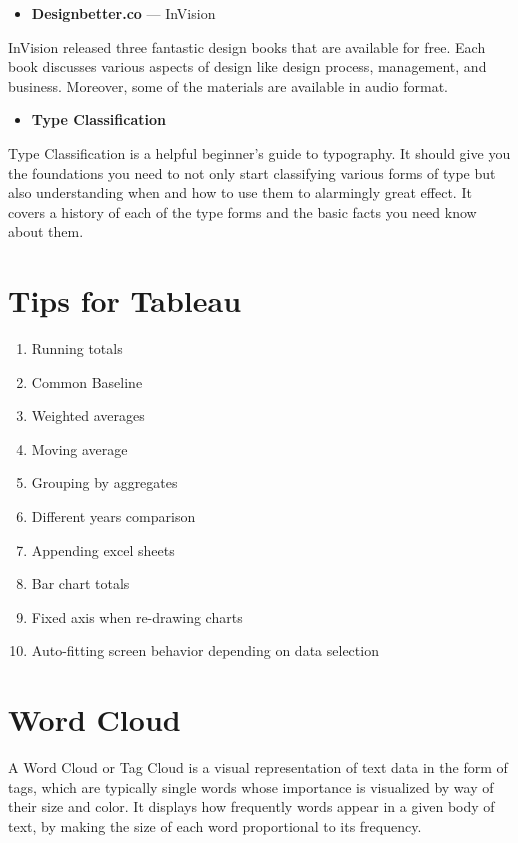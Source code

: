 \documentclass[]{book}
\providecommand{\tightlist}{%
  \setlength{\itemsep}{0pt}\setlength{\parskip}{0pt}}
\theoremstyle{definition}
\theoremstyle{definition}
\theoremstyle{definition}
\theoremstyle{remark}
\begin{document}
\begin{itemize}
\tightlist
\item
  \textbf{Designbetter.co} --- InVision
\end{itemize}

InVision released three fantastic design books that are available for
free. Each book discusses various aspects of design like design process,
management, and business. Moreover, some of the materials are available
in audio format.

\begin{itemize}
\tightlist
\item
  \textbf{Type Classification}
\end{itemize}

Type Classification is a helpful beginner's guide to typography. It
should give you the foundations you need to not only start classifying
various forms of type but also understanding when and how to use them to
alarmingly great effect. It covers a history of each of the type forms
and the basic facts you need know about them.\citep{design_ebooks}

\section{Tips for Tableau}\label{tips-for-tableau}

\begin{enumerate}
\def\labelenumi{\arabic{enumi}.}
\tightlist
\item
  Running totals
\item
  Common Baseline
\item
  Weighted averages
\item
  Moving average
\item
  Grouping by aggregates
\item
  Different years comparison
\item
  Appending excel sheets
\item
  Bar chart totals
\item
  Fixed axis when re-drawing charts
\item
  Auto-fitting screen behavior depending on data selection
\end{enumerate}

\section{Word Cloud}\label{word-cloud}

A Word Cloud or Tag Cloud is a visual representation of text data in the
form of tags, which are typically single words whose importance is
visualized by way of their size and color. It displays how frequently
words appear in a given body of text, by making the size of each word
proportional to its frequency.
\end{document}
